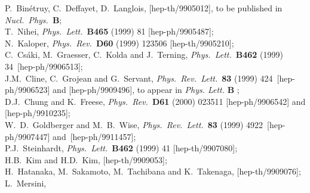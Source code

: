 \documentclass[a4paper,12pt]{article}
\begin{document}
\begin{thebibliography}{99}
P.\ Bin\'etruy, C.\ Deffayet, D.\ Langlois, [hep-th/9905012],
to be published in {\it Nucl.~Phys.}~{\bf B};\\
%
T.~Nihei,
{\it Phys.\ Lett.}\  {\bf B465} (1999) 81
[hep-ph/9905487];\\
%
N.~Kaloper,
{\it Phys.\ Rev.}\  {\bf D60} (1999) 123506
[hep-th/9905210];\\
%
C.~Cs\'aki, M.~Graesser, C.~Kolda and J.~Terning,
{\it Phys.\ Lett.}\  {\bf B462} (1999) 34~[hep-ph/9906513];\\
%
J.M.~Cline, C.~Grojean and G.~Servant,
{\it Phys.\ Rev.\ Lett.}\  {\bf 83} (1999) 424~[hep-ph/9906523]
and
[hep-ph/9909496], to appear in {\it Phys. Lett. } {\bf B} ;\\
%
D.J.~Chung and K.~Freese,
{\it Phys.\ Rev.}\  {\bf D61} (2000) 023511
[hep-ph/9906542]
and
[hep-ph/9910235];\\
%
W.~D.~Goldberger and M.~B.~Wise,
{\it Phys.\ Rev.\ Lett.}\  {\bf 83} (1999) 4922~[hep-ph/9907447]
and~[hep-ph/9911457];\\
%
P.J.~Steinhardt,
{\it Phys.\ Lett.}\  {\bf B462} (1999) 41
[hep-th/9907080];\\
%
H.B.~Kim and H.D.~Kim,
[hep-th/9909053];\\
%
H.~Hatanaka, M.~Sakamoto, M.~Tachibana and K.~Takenaga,
[hep-th/9909076];\\
%
L.~Mersini,

\end{thebibliography}
\end{document}
